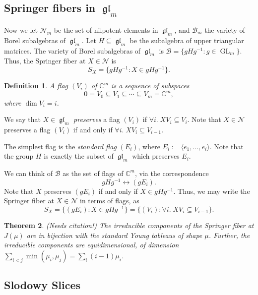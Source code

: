 \documentclass[12pt,psamsfonts]{article}
\DeclareMathOperator{\GL}{GL}
\DeclareMathOperator{\gl}{\mathfrak{gl}}
\newtheorem{theorem}{Theorem}[section]
\newtheorem{definition}[theorem]{Definition}
\begin{document}
\subsection{Springer fibers in \texorpdfstring{\(\gl_m\)}{gl\_m}}
Now we let \(\mathcal{N}_m\) be the set of nilpotent elements in \(\gl_m\), and \(\mathcal{B}_m\) the variety of Borel subalgebras of \(\gl_m\).
Let \(H \subseteq \gl_m\) be the subalgebra of upper triangular matrices.
The variety of Borel subalgebras of \(\gl_m\) is \(\mathcal{B} = \{gHg^{-1} : g \in \GL_m\}\).
Thus, the Springer fiber at \(X \in \mathcal{N}\) is 
\[S_X = \{gHg^{-1} : X \in gHg^{-1}\}.\]
\begin{definition}
    A \emph{flag} \((V_i)\) of \(\mathbb{C}^m\) is a sequence of subspaces
    \[0 = V_0 \subseteq V_1 \subseteq \cdots \subseteq V_m = \mathbb{C}^m,\]
    where \(\dim V_i = i\).
\end{definition}
We say that \(X \in \gl_m\) \emph{preserves} a flag \((V_i)\) if \(\forall i. \; XV_i \subseteq V_i\).
Note that \(X \in \mathcal{N}\) preserves a flag \((V_i)\) if and only if \(\forall i. \; XV_i \subseteq V_{i - 1}\).
\par The simplest flag is the \emph{standard flag} \((E_i)\), where \(E_i := \langle e_1, ..., e_i \rangle\).
Note that the group \(H\) is exactly the subset of \(\gl_m\) which preserves \(E_i\).
\par We can think of \(\mathcal{B}\) as the set of flags of \(\mathbb{C}^m\), via the correspondence 
\[gHg^{-1} \leftrightarrow (gE_i).\]
Note that \(X\) preserves \((gE_i)\) if and only if \(X \in gHg^{-1}\).
Thus, we may write the Springer fiber at \(X \in \mathcal{N}\) in terms of flags, as 
\[S_X = \{(gE_i) : X \in gHg^{-1}\} = \{(V_i) : \forall i. \; XV_i \subseteq V_{i - 1}\}.\]

\begin{theorem}\label{usual_springer_fiber}
    (Needs citation!)
    The irreducible components of the Springer fiber at \(J(\mu)\) are in bijection with the standard Young tableaus of shape \(\mu\).
    Further, the irreducible components are equidimensional, of dimension \(\sum_{i < j} \min(\mu_i, \mu_j) = \sum_i (i - 1) \mu_i\).
\end{theorem}

\subsection{Slodowy Slices}
\end{document}
